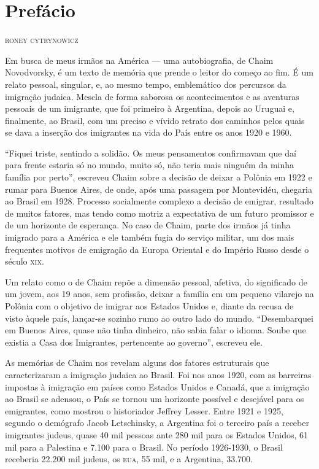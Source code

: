 \chapter[Prefácio, \textit{por Roney Cytrynowicz}]{Prefácio}

\begin{flushright}
\textsc{roney cytrynowicz} %
\end{flushright}\medskip

\noindent{}Em busca de meus irmãos na América --- uma autobiografia, de Chaim
Novodvorsky, é um texto de memória que prende o leitor do começo ao fim.
É um relato pessoal, singular, e, ao mesmo tempo, emblemático dos
percursos da imigração judaica. Mescla de forma saborosa os
acontecimentos e as aventuras pessoais de um imigrante, que foi primeiro
à Argentina, depois ao Uruguai e, finalmente, ao Brasil, com um preciso
e vívido retrato dos caminhos pelos quais se dava a inserção dos
imigrantes na vida do País entre os anos 1920 e 1960.

``Fiquei triste, sentindo a solidão. Os meus pensamentos confirmavam que
daí para frente estaria só no mundo, muito só, não teria mais ninguém da
minha família por perto'', escreveu Chaim sobre a decisão de deixar a
Polônia em 1922 e rumar para Buenos Aires, de onde, após uma passagem
por Montevidéu, chegaria ao Brasil em 1928. Processo socialmente
complexo a decisão de emigrar, resultado de muitos fatores, mas tendo
como motriz a expectativa de um futuro promissor e de um horizonte de
esperança. No caso de Chaim, parte dos irmãos já tinha imigrado para a
América e ele também fugia do serviço militar, um dos mais frequentes
motivos de emigração da Europa Oriental e do Império Russo desde o
século \textsc{xix}.

Um relato como o de Chaim repõe a dimensão pessoal, afetiva, do
significado de um jovem, aos 19 anos, sem profissão, deixar a família em
um pequeno vilarejo na Polônia com o objetivo de imigrar aos Estados
Unidos e, diante da recusa de visto àquele país, lançar-se sozinho rumo
ao outro lado do mundo. ``Desembarquei em Buenos Aires, quase não tinha
dinheiro, não sabia falar o idioma. Soube que existia a Casa dos
Imigrantes, pertencente ao governo'', escreveu ele.

As memórias de Chaim nos revelam alguns dos fatores estruturais que
caracterizaram a imigração judaica ao Brasil. Foi nos anos 1920, com as
barreiras impostas à imigração em países como Estados Unidos e Canadá,
que a imigração ao Brasil se adensou, o País se tornou um horizonte
possível e desejável para os emigrantes, como mostrou o historiador
Jeffrey Lesser. Entre 1921 e 1925, segundo o demógrafo Jacob
Letschinsky, a Argentina foi o terceiro país a receber imigrantes
judeus, quase 40 mil pessoas ante 280 mil para os Estados Unidos, 61 mil
para a Palestina e 7.100 para o Brasil. No período 1926-1930, o Brasil
receberia 22.200 mil judeus, os \textsc{eua}, 55 mil, e a Argentina, 33.700.

